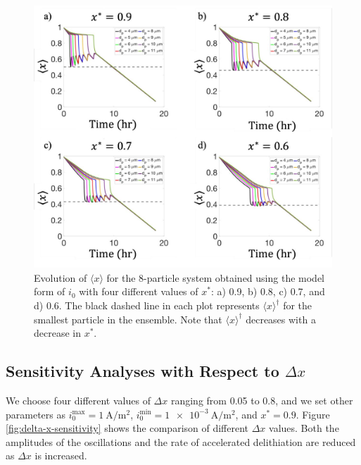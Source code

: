 \documentclass{article}
\begin{document}
\begin{figure}
  \includegraphics[width=\textwidth]{8-particle-evolution-xstar.png}
  \caption{Evolution of $\langle x \rangle$ for the 8-particle system obtained using
    the model form of $i_0$ with four different values of $x^\ast$: a)
    0.9, b) 0.8, c) 0.7, and d) 0.6. The black dashed line in each
    plot represents $\langle x \rangle^\dag$ for the smallest particle in the
    ensemble. Note that $\langle x \rangle^\dag$ decreases with a decrease in
    $x^\ast$.}
  \label{fig:x-star-sensitivity}
\end{figure}

\subsection{Sensitivity Analyses with Respect to $\Delta x$}

We choose four different values of $\Delta x$ ranging from 0.05 to
0.8, and we set other parameters as
$i_0^{\mathrm{max}}=\SI{1}{\ampere\per\meter\squared}$,
$i_0^{\mathrm{min}}=\SI{1e-3}{\ampere\per\meter\squared}$, and
$x^\ast=0.9$. Figure \ref{fig:delta-x-sensitivity} shows the comparison of different
$\Delta x$ values. Both the amplitudes of the oscillations and the
rate of accelerated delithiation are reduced as $\Delta x$ is
increased.
\end{document}

